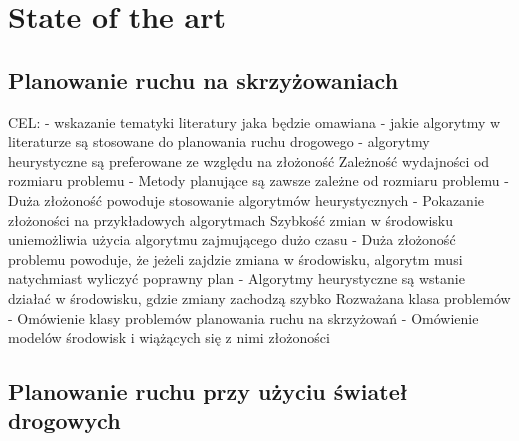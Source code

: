 \chapter{State of the art} \label{chap:state-of-the-art}

\section{Planowanie ruchu na skrzyżowaniach}

CEL:
\newline
- wskazanie tematyki literatury jaka będzie omawiana
\newline
- jakie algorytmy w literaturze są stosowane do planowania ruchu drogowego
\newline
- algorytmy heurystyczne są preferowane ze względu na złożoność
\newline
\newline
Zależność wydajności od rozmiaru problemu
\newline
- Metody planujące są zawsze zależne od rozmiaru problemu
\newline
- Duża złożoność powoduje stosowanie algorytmów heurystycznych
\newline
- Pokazanie złożoności na przykładowych algorytmach
\newline
\newline
Szybkość zmian w środowisku uniemożliwia użycia algorytmu zajmującego dużo czasu
\newline
- Duża złożoność problemu powoduje, że jeżeli zajdzie zmiana w środowisku, algorytm musi natychmiast wyliczyć poprawny plan
\newline
- Algorytmy heurystyczne są wstanie działać w środowisku, gdzie zmiany zachodzą szybko
\newline
\newline
Rozważana klasa problemów
\newline
- Omówienie klasy problemów planowania ruchu na skrzyżowań
\newline
- Omówienie modelów środowisk i wiążących się z nimi złożoności
\newline
\newline

\section{Planowanie ruchu przy użyciu świateł drogowych}

